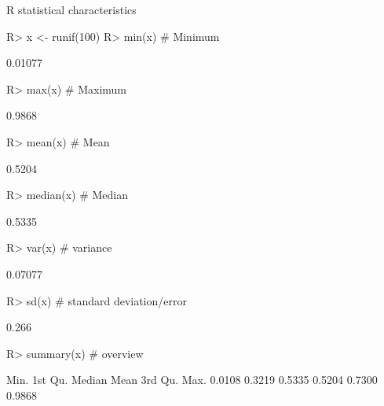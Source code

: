 \documentclass[10pt]{beamer}
\let\proglang=\textsf
\begin{document}
\begin{frame}[fragile]{\proglang{R} statistical characteristics}
\begin{Schunk}
\begin{Sinput}
R> x <- runif(100)
R> min(x)    # Minimum
\end{Sinput}
\begin{Soutput}
[1] 0.01077
\end{Soutput}
\begin{Sinput}
R> max(x)    # Maximum
\end{Sinput}
\begin{Soutput}
[1] 0.9868
\end{Soutput}
\begin{Sinput}
R> mean(x)   # Mean
\end{Sinput}
\begin{Soutput}
[1] 0.5204
\end{Soutput}
\begin{Sinput}
R> median(x) # Median
\end{Sinput}
\begin{Soutput}
[1] 0.5335
\end{Soutput}
\begin{Sinput}
R> var(x)    # variance
\end{Sinput}
\begin{Soutput}
[1] 0.07077
\end{Soutput}
\begin{Sinput}
R> sd(x)	  # standard deviation/error
\end{Sinput}
\begin{Soutput}
[1] 0.266
\end{Soutput}
\begin{Sinput}
R> summary(x) # overview
\end{Sinput}
\begin{Soutput}
   Min. 1st Qu.  Median    Mean 3rd Qu.    Max. 
 0.0108  0.3219  0.5335  0.5204  0.7300  0.9868 
\end{Soutput}
\end{Schunk}
\end{frame}
%
\end{document}
